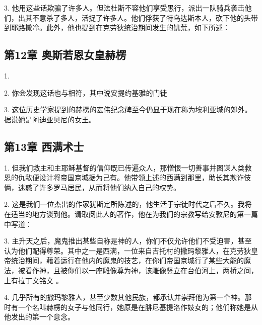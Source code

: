 3. 他用这些话欺骗了许多人。但法杜斯不容他们享受愚行，派出一队骑兵袭击他们，出其不意杀了多人，活捉了许多人。他们俘获了特乌达斯本人，砍下他的头带到耶路撒冷。此外，他也提到在克劳狄统治期间发生的饥荒，如下所述：\par


\subsection{第12章 奥斯若恩女皇赫楞}

1. \par

2. 你会发现这话也与相符，其中说安提约基雅的门徒\par

3. 这位历史学家提到的赫楞的宏伟纪念碑至今仍显于现在称为埃利亚城的郊外。据说她是阿迪亚贝尼的女王。\par


\subsection{第13章 西满术士}

1. 但我们救主和主耶稣基督的信仰既已传遍众人，那憎恨一切善事并图谋人类救恩的仇敌便设计将帝国京城据为己有。他带领上述的西满到那里，助长其欺诈伎俩，迷惑了许多罗马居民，从而将他们纳入自己的权势。\par

2. 这是我们一位杰出的作家犹斯定所陈述的，他生活于宗徒时代之后不久。我将在适当的地方谈到他。请取阅此人的著作，他在为我们的宗教写给安敦尼的第一篇中写道：\par

3. 主升天之后，魔鬼推出某些自称是神的人，你们不仅允许他们不受迫害，甚至认为他们配得尊荣。其中之一是西满，一位来自吉托村的撒玛黎雅人，在克劳狄皇帝统治期间，藉着运行在他内的魔鬼的技艺，在你们帝国京城行了某些大能的魔法，被看作神，且被你们以一座雕像尊为神，该雕像竖立在台伯河上，两桥之间，上有拉丁文铭文 。\par

4. 几乎所有的撒玛黎雅人，甚至少数其他民族，都承认并崇拜他为第一个神。那时有一个名叫赫楞的女子与他同行，她原是在腓尼基提洛作妓女的；他们称她是从他发出的第一个意念。\par

